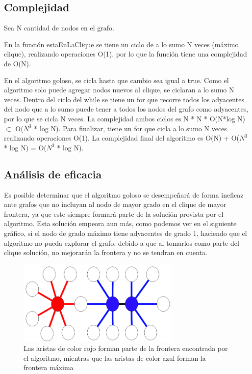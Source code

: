 \documentclass[a4paper, 10pt, twoside]{article}
\begin{document}
\subsection{Complejidad}
Sea N cantidad de nodos en el grafo.

En la función estaEnLaClique se tiene un ciclo de a lo sumo N veces (máximo clique), realizando operaciones O(1), por lo que la función tiene una complejidad de O(N).

En el algoritmo goloso, se cicla hasta que cambio sea igual a true. Como el algoritmo solo puede agregar nodos nuevos al clique, se ciclaran a lo sumo N veces.
Dentro del ciclo del while se tiene un for que recorre todos los adyacentes del nodo que a lo sumo puede tener a todos los nodos del grafo como adyacentes, por lo que se cicla N veces.
La complejidad ambos ciclos es N * N * O(N*log N) $\subset$ O($N^3$ * log N).
Para finalizar, tiene un for que cicla a lo sumo N veces realizando operaciones O(1).
La complejidad final del algoritmo es O(N) + O($N^3$ * log N) = O($N^3$ * log N).

\subsection{Análisis de eficacia}
Es posible determinar que el algoritmo goloso se desempeñará de forma ineficaz ante grafos que no incluyan al nodo de mayor grado en el clique de mayor frontera, ya que este siempre formará parte de la solución provista por el algoritmo. Esta solución empeora aun más, como podemos ver en el siguiente gráfico, si el nodo de grado máximo tiene adyacentes de grado 1, haciendo que el algoritmo no pueda explorar el grafo, debido a que al tomarlos como parte del clique solución, no mejorarán la frontera y no se tendran en cuenta.

\begin{figure}[H]
\includegraphics[width=80mm]{ejemploErrorGoloso.png}
\caption{Las aristas de color rojo forman parte de la frontera encontrada por el algoritmo, mientras que las aristas de color azul forman la frontera máxima}
\label{overflow}
\end{figure}
\end{document}
